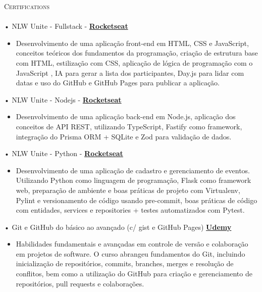 \documentclass[a4paper]{article}
\newcommand{\lineunder} {
    \vspace*{-8pt} \\
    \hspace*{-18pt} \hrulefill \\
}
\newcommand{\header} [1] {
    {\hspace*{-18pt}\vspace*{6pt} \textsc{#1}}
    \vspace*{-6pt} \lineunder
}
\begin{document}
\vspace*{3mm}

%
%
\header{Certifications}
\vspace{2mm}
• NLW Unite - Fullstack - \textbf{\href{https://app.rocketseat.com.br/certificates/d3577eb6-c50f-42f3-b595-b96297ef0e05}{Rocketseat}}\\
\begin{itemize}
    \item [] Desenvolvimento de uma aplicação front-end em HTML, CSS e JavaScript, conceitos teóricos dos fundamentos da programação, criação de estrutura base com HTML, estilização com CSS, aplicação de lógica de programação com o JavaScript , IA para gerar a lista dos participantes, Day.js para lidar com datas e uso do GitHub e GitHub Pages para publicar a aplicação.
\end{itemize}
\vspace*{1mm}
• NLW Unite - Nodejs - \textbf{\href{https://app.rocketseat.com.br/certificates/a53012ec-27a9-419e-9a8c-86f28508a406}{Rocketseat}}\\
\begin{itemize}
    \item [] Desenvolvimento de uma aplicação back-end em Node.js, aplicação dos conceitos de API REST, utilizando TypeScript, Fastify como framework, integração do Prisma ORM + SQLite e Zod para validação de dados.
\end{itemize}
\vspace*{1mm}
• NLW Unite - Python - \textbf{\href{https://app.rocketseat.com.br/certificates/c5f21b9b-53c5-4ed7-bc45-430d87cccf77}{Rocketseat}}\\
\begin{itemize}
    \item [] Desenvolvimento de uma aplicação de cadastro e gerenciamento de eventos. Utilizando Python como linguagem de programação, Flask como framework web, preparação de ambiente e boas práticas de projeto com Virtualenv, Pylint e versionamento de código usando pre-commit, boas práticas de código com entidades, services e repositories + testes automatizados com Pytest.
\end{itemize}
\vspace*{1mm}
• Git e GitHub do básico ao avançado (c/ gist e GitHub Pages) \textbf{\href{https://www.udemy.com/certificate/UC-db57cce7-1471-47ff-9828-0e3a4d7da628/}{Udemy}}\\
\begin{itemize}
    \item [] Habilidades fundamentais e avançadas em controle de versão e colaboração em projetos de software. O curso abrangeu fundamentos do Git, incluindo inicialização de repositórios, commits, branches, merges e resolução de conflitos,
          bem como a utilização do GitHub para criação e gerenciamento de repositórios, pull requests e colaborações.
\end{itemize}
\end{document}
